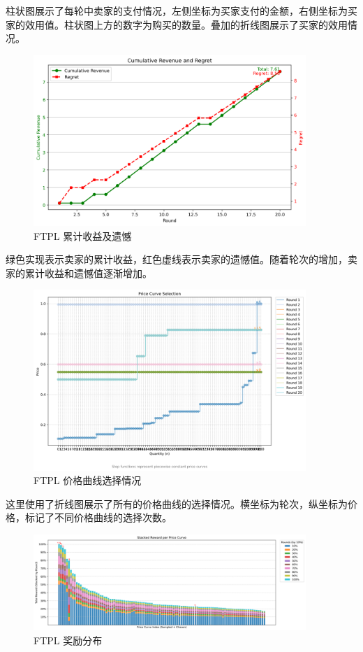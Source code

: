 柱状图展示了每轮中卖家的支付情况，左侧坐标为买家支付的金额，右侧坐标为买家的效用值。柱状图上方的数字为购买的数量。叠加的折线图展示了买家的效用情况。

\begin{figure}[H]
    \centering
    \includegraphics[width=0.92\textwidth]{figures/FTPL_cumulative_revenue}
    \caption{FTPL 累计收益及遗憾}
\end{figure}

绿色实现表示卖家的累计收益，红色虚线表示卖家的遗憾值。随着轮次的增加，卖家的累计收益和遗憾值逐渐增加。

\begin{figure}[H]
    \centering
    \includegraphics[width=0.92\textwidth]{figures/FTPL_price_curve_selection}
    \caption{FTPL 价格曲线选择情况}
\end{figure}

这里使用了折线图展示了所有的价格曲线的选择情况。横坐标为轮次，纵坐标为价格，标记了不同价格曲线的选择次数。

\begin{figure}[H]
    \centering
    \includegraphics[width=0.92\textwidth]{figures/FTPL_reward_distribution}
    \caption{FTPL 奖励分布}
\end{figure}

